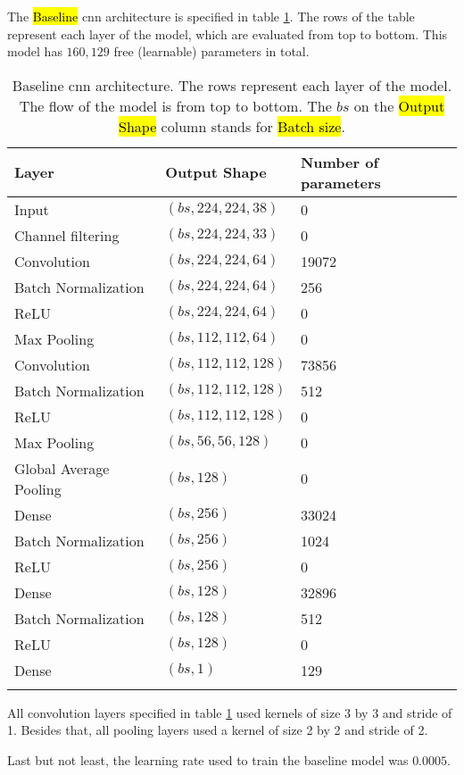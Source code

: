 

\graphicspath{{./Sections/Methodology/Resources/}}


The \hl{Baseline} \gls{cnn} architecture is specified in table \ref{table:metho:models:baseline}. The rows of the table represent each layer of the model, which are evaluated from top to bottom. This model has $160,129$ free (learnable) parameters in total.

\setlength{\mylinewidth}{\linewidth-7pt}%
\setlength{\mylengtha}{0.35\mylinewidth-2\arraycolsep}%
\setlength{\mylengthb}{0.25\mylinewidth-2\arraycolsep}%
\setlength{\mylengthc}{0.18\mylinewidth-2\arraycolsep}%

\begin{longtable}{m{\mylengtha} | m{\mylengthb} | m{\mylengthc}}
    \hline
    Layer & Output Shape & Number of parameters \\
    \hline
    Input & $(bs, 224, 224, 38)$ & 0 \\
    \hline
    Channel filtering & $(bs, 224, 224, 33)$ & 0 \\
    \hline
    Convolution & $(bs, 224, 224, 64)$ & 19072 \\
    \hline
    Batch Normalization & $(bs, 224, 224, 64)$ & 256 \\
    \hline
    ReLU & $(bs, 224, 224, 64)$ & 0 \\
    \hline
    Max Pooling & $(bs, 112, 112, 64)$ & 0 \\
    \hline
    Convolution & $(bs, 112, 112, 128)$ & 73856 \\
    \hline
    Batch Normalization & $(bs, 112, 112, 128)$ & 512 \\
    \hline
    ReLU & $(bs, 112, 112, 128)$ & 0 \\
    \hline
    Max Pooling & $(bs, 56, 56, 128)$ & 0 \\
    \hline
    Global Average Pooling & $(bs, 128)$ & 0 \\
    \hline
    Dense & $(bs, 256)$ & 33024 \\
    \hline
    Batch Normalization & $(bs, 256)$ & 1024 \\
    \hline
    ReLU & $(bs, 256)$ & 0 \\
    \hline
    Dense & $(bs, 128)$ & 32896 \\
    \hline
    Batch Normalization & $(bs, 128)$ & 512 \\
    \hline
    ReLU & $(bs, 128)$ & 0 \\
    \hline
    Dense & $(bs, 1)$ & 129 \\
    \hline
  \caption{Baseline \gls{cnn} architecture. The rows represent each layer of the model. The flow of the model is from top to bottom. The $bs$ on the \hl{Output Shape} column stands for \hl{Batch size}.}
  \label{table:metho:models:baseline}
\end{longtable}

All convolution layers specified in table \ref{table:metho:models:baseline} used kernels of size 3 by 3 and stride of 1. Besides that, all pooling layers used a kernel of size 2 by 2 and stride of 2.

Last but not least, the learning rate used to train the baseline model was $0.0005$.
